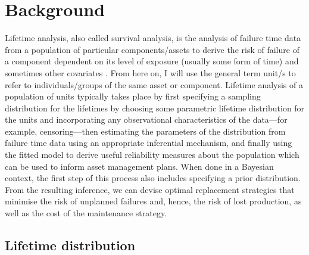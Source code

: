 \section{Background} \label{sec:lifetime-data-background}

Lifetime analysis, also called survival analysis, is the analysis of failure time data from a population of particular components/assets to derive the risk of failure of a component dependent on its level of exposure (usually some form of time) and sometimes other covariates \citep{moore2016}. From here on, I will use the general term unit/s to refer to individuals/groups of the same asset or component. Lifetime analysis of a population of units typically takes place by first specifying a sampling distribution for the lifetimes by choosing some parametric lifetime distribution for the units and incorporating any observational characteristics of the data---for example, censoring---then estimating the parameters of the distribution from failure time data using an appropriate inferential mechanism, and finally using the fitted model to derive useful reliability measures about the population which can be used to inform asset management plans. When done in a Bayesian context, the first step of this process also includes specifying a prior distribution. From the resulting inference, we can devise optimal replacement strategies that minimise the risk of unplanned failures and, hence, the risk of lost production, as well as the cost of the maintenance strategy.

\subsection{Lifetime distribution}

